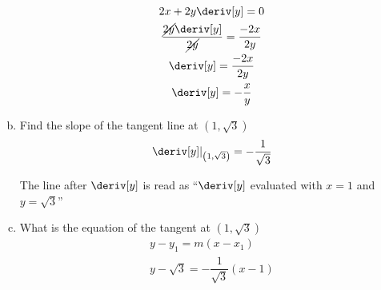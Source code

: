 \begin{example}
\begin{example}
\begin{enumerate}[a)]
\begin{gather*}
                2x + 2y\deriv[y] = 0 \\
                \dfrac{\cancel{2y}\deriv[y]}{\cancel{2y}} = \dfrac{-2x}{2y} \\
                \deriv[y] = \dfrac{-2x}{2y} \\
                \deriv[y] = -\dfrac{x}{y}
            \end{gather*}
            \item Find the slope of the tangent line at $\left(1, \sqrt{3}\right)$ \\
            \begin{equation*}
                \Eval{\deriv[y]}{\left(1, \sqrt{3}\right)} = - \dfrac{1}{\sqrt{3}}
            \end{equation*}
            \begin{note}
                The line after $\deriv[y]$ is read as ``$\deriv[y]$ evaluated with $ x= 1$ and $y = \sqrt{3}$''
            \end{note}
            \item What is the equation of the tangent at $\left(1, \sqrt{3}\right)$
            \begin{gather*}
                y - y_1 = m\left(x - x_1\right) \\
                y - \sqrt{3} = - \dfrac{1}{\sqrt{3}}\left(x - 1\right)
            \end{gather*}
        \end{enumerate}
    \end{example}
\end{example}
